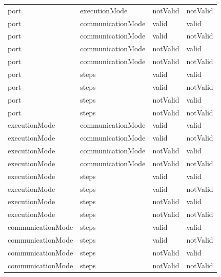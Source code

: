 \begin{table}[H]
\begin{tabular}{llll}
        port          & executionMode     & notValid        & notValid        \\
        port          & communicationMode & valid           & valid           \\
        port          & communicationMode & valid           & notValid        \\
        port          & communicationMode & notValid        & valid           \\
        port          & communicationMode & notValid        & notValid        \\
        port          & steps             & valid           & valid           \\
        port          & steps             & valid           & notValid        \\
        port          & steps             & notValid        & valid           \\
        port          & steps             & notValid        & notValid        \\
        executionMode & communicationMode & valid           & valid           \\
        executionMode & communicationMode & valid           & notValid        \\
        executionMode & communicationMode & notValid        & valid           \\
        executionMode & communicationMode & notValid        & notValid        \\
        executionMode          & steps             & valid           & valid           \\
        executionMode          & steps             & valid           & notValid        \\
        executionMode          & steps             & notValid        & valid           \\
        executionMode          & steps             & notValid        & notValid        \\
        communicationMode      & steps             & valid           & valid           \\
        communicationMode      & steps             & valid           & notValid        \\
        communicationMode      & steps             & notValid        & valid           \\
        communicationMode      & steps             & notValid        & notValid
    \end{tabular}
\end{table}


